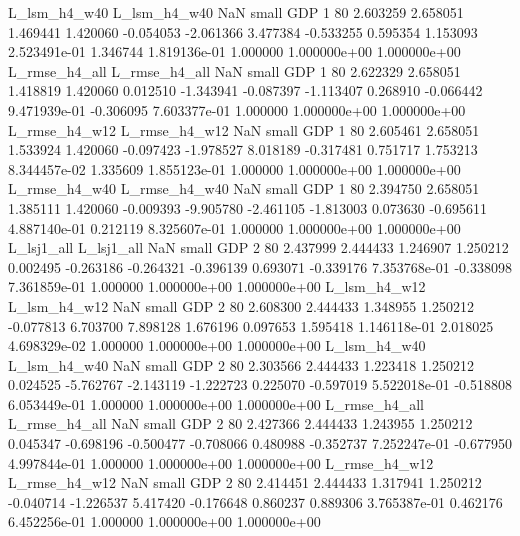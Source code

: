  L_lsm_h4_w40  L_lsm_h4_w40                   NaN      small      GDP                 1 80 2.603259       2.658051 1.469441       1.420060   -0.054053     -2.061366      3.477384    -0.533255       0.595354  1.153093 2.523491e-01     1.346744   1.819136e-01            1.000000    1.000000e+00        1.000000e+00
L_rmse_h4_all L_rmse_h4_all                   NaN      small      GDP                 1 80 2.622329       2.658051 1.418819       1.420060    0.012510     -1.343941     -0.087397    -1.113407       0.268910 -0.066442 9.471939e-01    -0.306095   7.603377e-01            1.000000    1.000000e+00        1.000000e+00
L_rmse_h4_w12 L_rmse_h4_w12                   NaN      small      GDP                 1 80 2.605461       2.658051 1.533924       1.420060   -0.097423     -1.978527      8.018189    -0.317481       0.751717  1.753213 8.344457e-02     1.335609   1.855123e-01            1.000000    1.000000e+00        1.000000e+00
L_rmse_h4_w40 L_rmse_h4_w40                   NaN      small      GDP                 1 80 2.394750       2.658051 1.385111       1.420060   -0.009393     -9.905780     -2.461105    -1.813003       0.073630 -0.695611 4.887140e-01     0.212119   8.325607e-01            1.000000    1.000000e+00        1.000000e+00
   L_lsj1_all    L_lsj1_all                   NaN      small      GDP                 2 80 2.437999       2.444433 1.246907       1.250212    0.002495     -0.263186     -0.264321    -0.396139       0.693071 -0.339176 7.353768e-01    -0.338098   7.361859e-01            1.000000    1.000000e+00        1.000000e+00
 L_lsm_h4_w12  L_lsm_h4_w12                   NaN      small      GDP                 2 80 2.608300       2.444433 1.348955       1.250212   -0.077813      6.703700      7.898128     1.676196       0.097653  1.595418 1.146118e-01     2.018025   4.698329e-02            1.000000    1.000000e+00        1.000000e+00
 L_lsm_h4_w40  L_lsm_h4_w40                   NaN      small      GDP                 2 80 2.303566       2.444433 1.223418       1.250212    0.024525     -5.762767     -2.143119    -1.222723       0.225070 -0.597019 5.522018e-01    -0.518808   6.053449e-01            1.000000    1.000000e+00        1.000000e+00
L_rmse_h4_all L_rmse_h4_all                   NaN      small      GDP                 2 80 2.427366       2.444433 1.243955       1.250212    0.045347     -0.698196     -0.500477    -0.708066       0.480988 -0.352737 7.252247e-01    -0.677950   4.997844e-01            1.000000    1.000000e+00        1.000000e+00
L_rmse_h4_w12 L_rmse_h4_w12                   NaN      small      GDP                 2 80 2.414451       2.444433 1.317941       1.250212   -0.040714     -1.226537      5.417420    -0.176648       0.860237  0.889306 3.765387e-01     0.462176   6.452256e-01            1.000000    1.000000e+00        1.000000e+00
